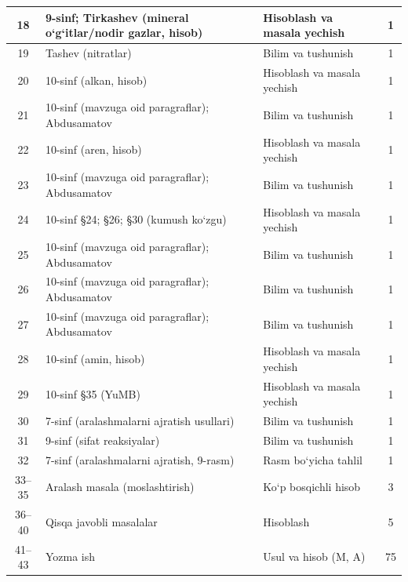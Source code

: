 \documentclass[11pt,a4paper]{article}
\begin{document}
{\begin{longtable}{|c|p{7.2cm}|p{5.4cm}|c|}
18 & 9-sinf; Tirkashev (mineral o`g`itlar/nodir gazlar, hisob) & Hisoblash va masala yechish & 1\\\hline
19 & Tashev (nitratlar) & Bilim va tushunish & 1\\\hline
20 & 10-sinf (alkan, hisob) & Hisoblash va masala yechish & 1\\\hline
21 & 10-sinf (mavzuga oid paragraflar); Abdusamatov & Bilim va tushunish & 1\\\hline
22 & 10-sinf (aren, hisob) & Hisoblash va masala yechish & 1\\\hline
23 & 10-sinf (mavzuga oid paragraflar); Abdusamatov & Bilim va tushunish & 1\\\hline
24 & 10-sinf \S{}24; \S{}26; \S{}30 (kumush ko`zgu) & Hisoblash va masala yechish & 1\\\hline
25 & 10-sinf (mavzuga oid paragraflar); Abdusamatov & Bilim va tushunish & 1\\\hline
26 & 10-sinf (mavzuga oid paragraflar); Abdusamatov & Bilim va tushunish & 1\\\hline
27 & 10-sinf (mavzuga oid paragraflar); Abdusamatov & Bilim va tushunish & 1\\\hline
28 & 10-sinf (amin, hisob) & Hisoblash va masala yechish & 1\\\hline
29 & 10-sinf \S{}35 (YuMB) & Hisoblash va masala yechish & 1\\\hline
30 & 7-sinf (aralashmalarni ajratish usullari) & Bilim va tushunish & 1\\\hline
31 & 9-sinf (sifat reaksiyalar) & Bilim va tushunish & 1\\\hline
32 & 7-sinf (aralashmalarni ajratish, 9-rasm) & Rasm bo`yicha tahlil & 1\\\hline
33--35 & Aralash masala (moslashtirish) & Ko`p bosqichli hisob & 3\\\hline
36--40 & Qisqa javobli masalalar & Hisoblash & 5\\\hline
41--43 & Yozma ish & Usul va hisob (M, A) & 75\\\hline
\end{longtable}}
\end{document}
